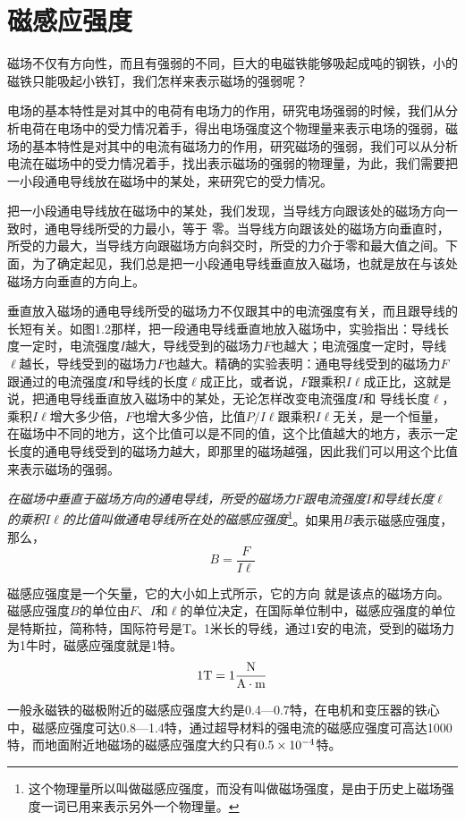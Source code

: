 \section{磁感应强度}
磁场不仅有方向性，而且有强弱的不同，巨大的电磁铁能够吸起成吨的钢铁，小的磁铁只能吸起小铁钉，我们怎样来表示磁场的强弱呢？

电场的基本特性是对其中的电荷有电场力的作用，研究电场强弱的时候，我们从分析电荷在电场中的受力情况着手，得出电场强度这个物理量来表示电场的强弱，磁场的基本特性是对其中的电流有磁场力的作用，研究磁场的强弱，我们可以从分析电流在磁场中的受力情况着手，找出表示磁场的强弱的物理量，为此，我们需要把一小段通电导线放在磁场中的某处，来研究它的受力情况。

把一小段通电导线放在磁场中的某处，我们发现，当导线方向跟该处的磁场方向一致时，通电导线所受的力最小，等于
零。当导线方向跟该处的磁场方向垂直时，所受的力最大，当导线方向跟磁场方向斜交时，所受的力介于零和最大值之间。下面，为了确定起见，我们总是把一小段通电导线垂直放入磁场，也就是放在与该处磁场方向垂直的方向上。

垂直放入磁场的通电导线所受的磁场力不仅跟其中的电流强度有关，而且跟导线的长短有关。如图1.2那样，把一段通电导线垂直地放入磁场中，实验指出：导线长度一定时，电流强度$I$越大，导线受到的磁场力$F$也越大；电流强度一定时，导线$\ell$越长，导线受到的磁场力$F$也越大。精确的实验表明：通电导线受到的磁场力$F$跟通过的电流强度$I$和导线的长度$\ell$成正比，或者说，$F$跟乘积$I\ell$成正比，这就是说，把通电导线垂直放入磁场中的某处，无论怎样改变电流强度$I$和
导线长度$\ell$，乘积$I\ell$增大多少倍，$F$也增大多少倍，比值$P/I\ell$跟乘积$I\ell$无关，是一个恒量，在磁场中不同的地方，这个比值可以是不同的值，这个比值越大的地方，表示一定长度的通电导线受到的磁场力越大，即那里的磁场越强，因此我们可以用这个比值来表示磁场的强弱。

\textit{在磁场中垂直于磁场方向的通电导线，所受的磁场力$F$跟电流强度$I$和导线长度$\ell$的乘积$I\ell$的比值叫做通电导线所在处的磁感应强度}\footnote{这个物理量所以叫做磁感应强度，而没有叫做磁场强度，是由于历史上磁场强度一词已用来表示另外一个物理量。}。如果用$B$表示磁感应强度，那么，
\[B=\frac{F}{I\ell}\]

磁感应强度是一个矢量，它的大小如上式所示，它的方向
就是该点的磁场方向。磁感应强度$B$的单位由$F$、$I$和$\ell$的单位决定，在国际单位制中，磁感应强度的单位是特斯拉，简称特，国际符号是T。1米长的导线，通过1安的电流，受到的磁场力为1牛时，磁感应强度就是1特。
\[1{\rm T}=1\frac{\rm N}{\rm A\cdot m}\]

一般永磁铁的磁极附近的磁感应强度大约是0.4—0.7特，在电机和变压器的铁心中，磁感应强度可达0.8—1.4特，通过超导材料的强电流的磁感应强度可高达1000特，而地面附近地磁场的磁感应强度大约只有$0.5\times 10^{-4}$特。

